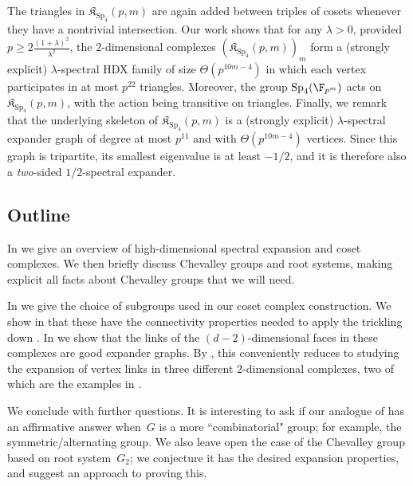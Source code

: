 \documentclass[11pt]{article}
\newcommand{\SP}{{\mathrm{Sp}}}
\newcommand{\complex}{\mathfrak{K}}
\begin{document}
The triangles in $\complex_{\SP_4}(p,m)$ are again added between triples of cosets whenever they have a nontrivial intersection.
Our work shows that for any $\lambda > 0$, provided~$p \geq 2\frac{(1+\lambda)^2}{\lambda^2}$, the $2$-dimensional complexes $(\complex_{\SP_4}(p,m))_{m}$ form a (strongly explicit) $\lambda$-spectral HDX family of size $\Theta(p^{10m-4})$ in which each vertex participates in at most $p^{22}$ triangles.
Moreover, the group $\SP_4(\F_{p^m})$ acts on $\complex_{\SP_4}(p,m)$, with the action being transitive on triangles.
Finally, we remark that the underlying skeleton of $\complex_{\SP_4}(p,m)$ is a (strongly explicit) $\lambda$-spectral expander graph of degree at most $p^{11}$ and with $\Theta(p^{10m-4})$ vertices.
Since this graph is tripartite, its smallest eigenvalue is at least $-1/2$, and it is therefore also a \emph{two}-sided $1/2$-spectral expander.


\subsection{Outline}
In  we give an overview of high-dimensional spectral expansion and coset complexes. We then briefly discuss Chevalley groups and root systems, making explicit all facts about Chevalley groups that we will need.

In  we give the choice of subgroups used in our coset complex construction. We show in  that these have the connectivity properties needed to apply the trickling down . In  we show that the links of the $(d-2)$-dimensional faces in these complexes are good expander graphs. By , this conveniently reduces to studying the expansion of vertex links in three different $2$-dimensional complexes, two of which are the examples in .

We conclude with further questions. It is interesting to ask if our analogue of  has an affirmative answer when~$G$ is a more ``combinatorial" group; for example, the symmetric/alternating group. We also leave open the case of the Chevalley group based on root system~$G_2$; we conjecture it has the desired expansion properties, and suggest an approach to proving this.
\end{document}

